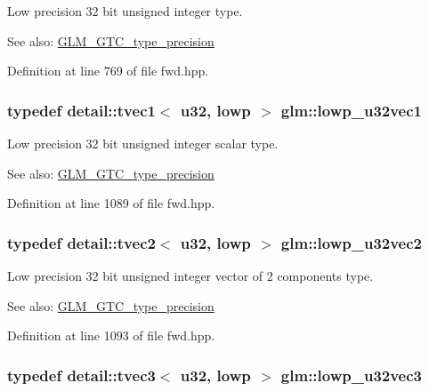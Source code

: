 Low precision 32 bit unsigned integer type. \begin{Desc}
\item[See also:]\hyperlink{group__gtc__type__precision}{GLM\_\-GTC\_\-type\_\-precision} \end{Desc}


Definition at line 769 of file fwd.hpp.\hypertarget{group__gtc__type__precision_g579d71c2ae1225b689aaab0bc7d33146}{
\subsubsection[lowp\_\-u32vec1]{\setlength{\rightskip}{0pt plus 5cm}typedef detail::tvec1$<$ u32, lowp $>$ {\bf glm::lowp\_\-u32vec1}}}
\label{group__gtc__type__precision_g579d71c2ae1225b689aaab0bc7d33146}


Low precision 32 bit unsigned integer scalar type. \begin{Desc}
\item[See also:]\hyperlink{group__gtc__type__precision}{GLM\_\-GTC\_\-type\_\-precision} \end{Desc}


Definition at line 1089 of file fwd.hpp.\hypertarget{group__gtc__type__precision_g2f588e15c609987b89bd03f50b2a492d}{
\subsubsection[lowp\_\-u32vec2]{\setlength{\rightskip}{0pt plus 5cm}typedef detail::tvec2$<$ u32, lowp $>$ {\bf glm::lowp\_\-u32vec2}}}
\label{group__gtc__type__precision_g2f588e15c609987b89bd03f50b2a492d}


Low precision 32 bit unsigned integer vector of 2 components type. \begin{Desc}
\item[See also:]\hyperlink{group__gtc__type__precision}{GLM\_\-GTC\_\-type\_\-precision} \end{Desc}


Definition at line 1093 of file fwd.hpp.\hypertarget{group__gtc__type__precision_g53b6133cd2491fce1445c1744556b1bb}{
\subsubsection[lowp\_\-u32vec3]{\setlength{\rightskip}{0pt plus 5cm}typedef detail::tvec3$<$ u32, lowp $>$ {\bf glm::lowp\_\-u32vec3}}}
\label{group__gtc__type__precision_g53b6133cd2491fce1445c1744556b1bb}



